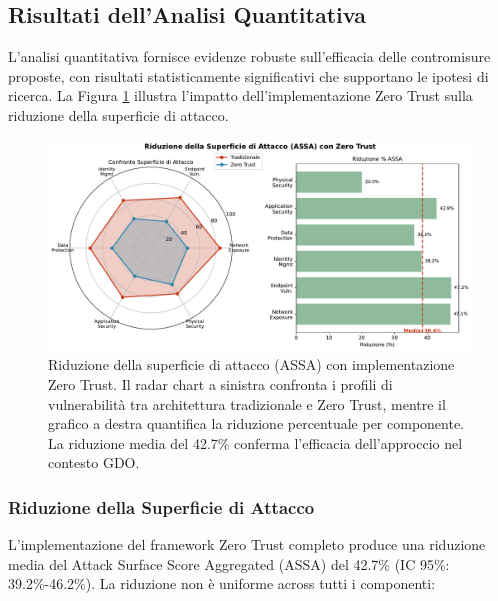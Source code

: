 \subsection{Risultati dell'Analisi Quantitativa}

L'analisi quantitativa fornisce evidenze robuste sull'efficacia delle contromisure proposte, con risultati statisticamente significativi che supportano le ipotesi di ricerca. La Figura \ref{fig:assa_reduction} illustra l'impatto dell'implementazione Zero Trust sulla riduzione della superficie di attacco.

\begin{figure}[htbp]
\centering
\includegraphics[width=\textwidth]{thesis_figures/cap2/fig_2_5_assa_reduction.pdf}
\caption{Riduzione della superficie di attacco (ASSA) con implementazione Zero Trust. Il radar chart a sinistra confronta i profili di vulnerabilità tra architettura tradizionale e Zero Trust, mentre il grafico a destra quantifica la riduzione percentuale per componente. La riduzione media del 42.7\% conferma l'efficacia dell'approccio nel contesto GDO.}
\label{fig:assa_reduction}
\end{figure}

\subsubsection{Riduzione della Superficie di Attacco}

L'implementazione del framework Zero Trust completo produce una riduzione media del Attack Surface Score Aggregated (ASSA) del 42.7\% (IC 95\%: 39.2\%-46.2\%). La riduzione non è uniforme across tutti i componenti:

